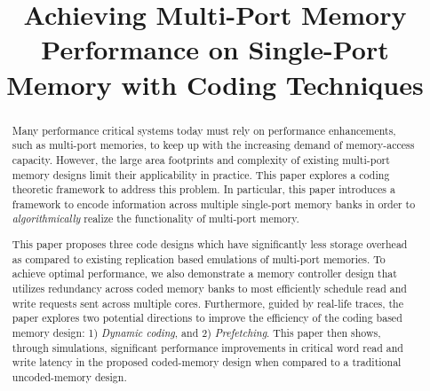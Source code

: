 \documentclass{sig-alternate}
\title{Achieving Multi-Port Memory Performance on Single-Port Memory with Coding Techniques}
\begin{document}
\maketitle
\thispagestyle{firstpage}
\pagestyle{plain}




\begin{abstract}
Many performance critical systems today must rely on performance enhancements, such as multi-port memories, to keep up with the increasing demand of memory-access capacity. However, the large area footprints and complexity of existing multi-port memory designs limit their applicability in practice. This paper explores a coding theoretic framework to address this problem. In particular, this paper introduces a framework to encode information across multiple single-port memory banks in order to {\em algorithmically} realize the functionality of multi-port memory.

This paper proposes three code designs which have significantly less storage overhead as compared to existing replication based emulations of multi-port memories. To achieve optimal performance, we also demonstrate a memory controller design that utilizes redundancy across coded memory banks to most efficiently schedule read and write requests sent across multiple cores. Furthermore, guided by real-life traces, the paper explores two potential directions to improve the efficiency of the coding based memory design: 1) {\em Dynamic coding}, and 2) {\em Prefetching}. This paper then shows, through simulations, significant performance improvements in critical word read and write latency in the proposed coded-memory design when compared to a traditional uncoded-memory design.

\begin{comment}
Many performance focussed systems need to rely on enhancements like multi-port memories to keep up with the increasing demand of access capacity, especially in a multi-core setup. However, the large area footprints and complexity of the existing designs of multi-port memories limits their applicability in practice. This paper explores a coding theoretic framework to address this problem in multi-port memory designs. 
In particular, this paper encodes the information across multiple single-port memory banks in order to {\em algorithmically} realize the functionality of a multi-port memory. 


\end{comment}
\end{abstract}
\end{document}
